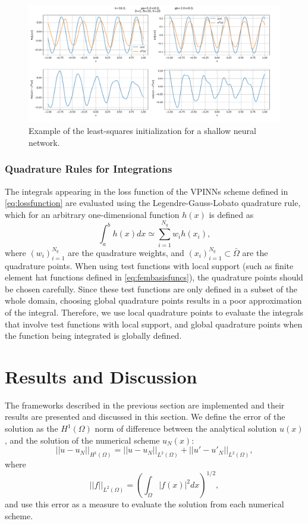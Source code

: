 \begin{figure}[h!]
    \centering
    \includegraphics[width=.7\textwidth]{img/VPINN-lsinit.png}
    \caption{Example of the least-squares initialization for a shallow neural network.}
    \label{fig:lsinit}
\end{figure}

\subsubsection{Quadrature Rules for Integrations}\label{sec:quadraturerules}
The integrals appearing in the loss function of the VPINNs scheme defined in \eqref{eq:lossfunction} are evaluated using the Legendre-Gauss-Lobato quadrature rule, which for an arbitrary one-dimensional function $h(x)$ is defined as
\begin{equation}
    \label{eq:quadrature}
    \int_{a}^{b}h(x)dx \simeq \sum_{i=1}^{N_q}{w_i h(x_i)},
\end{equation}
where ${(w_i)}_{i=1}^{N_q}$ are the quadrature weights, and ${(x_i)}_{i=1}^{N_q} \subset \bar{\Omega}$ are the quadrature points. When using test functions with local support (such as finite element hat functions defined in \eqref{eq:fembasisfuncs}), the quadrature points should be chosen carefully. Since these test functions are only defined in a subset of the whole domain, choosing global quadrature points results in a poor approximation of the integral. Therefore, we use local quadrature points to evaluate the integrals that involve test functions with local support, and global quadrature points when the function being integrated is globally defined.

\section{Results and Discussion}\label{sec:results}
The frameworks described in the previous section are implemented and their results are presented and discussed in this section. We define the error of the solution as the $H^1{(\Omega)}$ norm of difference between the analytical solution $u(x)$, and the solution of the numerical scheme $u_N(x)$:
\begin{equation}
    \label{eq:H1error}
    ||u - u_N||_{H^1{(\Omega)}} = ||u - u_N||_{L^2{(\Omega)}} + ||u' - u'_N||_{L^2{(\Omega)}},
\end{equation}
where
\begin{equation}
    \label{eq:L2error}
    ||f||_{L^2{(\Omega)}} = \left( \int_{\Omega}{|f(x)|^2dx} \right) ^{1/2},
\end{equation}
and use this error as a measure to evaluate the solution from each numerical scheme.

